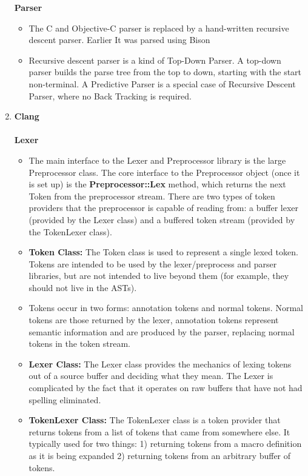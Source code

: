 \documentclass[english,a4paper,12pt]{article}
\begin{document}
\begin{enumerate}
        \textbullet \textbf{Parser}
            \begin{itemize}
                \item The C and Objective-C parser is replaced by a hand-written recursive descent parser. Earlier It was parsed using Bison
                \item Recursive descent parser is a kind of Top-Down Parser. A top-down parser builds the parse tree from the top to down, starting with the start non-terminal. A Predictive Parser is a special case of Recursive Descent Parser, where no Back Tracking is required.
            \end{itemize}
    
        \newpage
        
        \item {\textbf{Clang}}\\~\\
        \textbullet \textbf{Lexer}
        \begin{itemize}
            \item  The main interface to the Lexer and Preprocessor library is the large Preprocessor class. The core interface to the Preprocessor object (once it is set up) is the \textbf{Preprocessor::Lex} method, which returns the next Token from the preprocessor stream. There are two types of token providers that the preprocessor is capable of reading from: a buffer lexer (provided by the Lexer class) and a buffered token stream (provided by the TokenLexer class).
            \item \textbf{Token Class:} The Token class is used to represent a single lexed token. Tokens are intended to be used by the lexer/preprocess and parser libraries, but are not intended to live beyond them (for example, they should not live in the ASTs).
            \item Tokens occur in two forms: annotation tokens and normal tokens. Normal tokens are those returned by the lexer, annotation tokens represent semantic information and are produced by the parser, replacing normal tokens in the token stream.
            \item \textbf{Lexer Class: } The Lexer class provides the mechanics of lexing tokens out of a source buffer and deciding what they mean. The Lexer is complicated by the fact that it operates on raw buffers that have not had spelling eliminated. 
            \item \textbf{TokenLexer Class: }The TokenLexer class is a token provider that returns tokens from a list of tokens that came from somewhere else. It typically used for two things: 1) returning tokens from a macro definition as it is being expanded 2) returning tokens from an arbitrary buffer of tokens.
        \end{itemize}
        

\end{enumerate}
\end{document}

